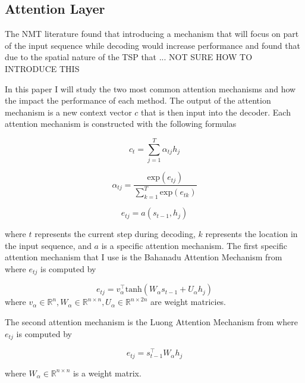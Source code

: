 \documentclass[12pt]{article}
\begin{document}
\subsection{Attention Layer}

The NMT literature found that introducing a mechanism that will focus on part of the input sequence while decoding would increase performance and \citet{2015_Vinyals} found that due to the spatial nature of the TSP that ... NOT SURE HOW TO INTRODUCE THIS

In this paper I will study the two most common attention mechanisms and how the impact the performance of each method. The output of the attention mechanism is a new context vector $c$ that is then input into the decoder. Each attention mechanism is constructed with the following formulas

\begin{equation*}
  c_t=\sum_{j=1}^T \alpha_{tj}h_j
\end{equation*}

\begin{equation*}
  \alpha_{tj}=\frac{\text{exp}(e_{tj})}{\sum_{k=1}^T\text{exp}(e_{tk})}
\end{equation*}

\begin{equation*}
  e_{tj}=a(s_{t-1},h_j)
\end{equation*}

where $t$ represents the current step during decoding, $k$ represents the location in the input sequence, and $a$ is a specific attention mechanism. The first specific attention mechanism that I use is the Bahanadu Attention Mechanism from \citet{2014_bah} where $e_{tj}$ is computed by

\begin{equation*}
  e_{tj}=v_\alpha^\top\text{tanh}(W_\alpha s_{t-1}+U_\alpha h_j)
\end{equation*}
where $v_\alpha \in \mathbb{R}^n, W_\alpha \in \mathbb{R}^{n \times n},U_\alpha \in \mathbb{R}^{n \times 2n}$ are weight matricies.

The second attention mechanism is the Luong Attention Mechanism from \citet{2015_luong} where $e_{tj}$ is computed by

\begin{equation*}
  e_{tj}= s_{t-1}^\top W_\alpha h_j
\end{equation*}

where $W_\alpha \in \mathbb{R}^{n \times n}$ is a weight matrix.

\end{document}
